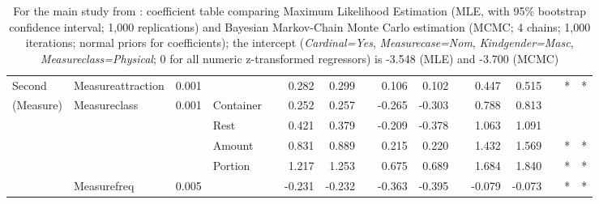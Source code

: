 \begin{table}
{\begin{tabular}{llrlp{0.5em}rrp{0.5em}rrp{0.5em}rrp{0.5em}cc}
       Second    & Measureattraction &  0.001 &           &&  0.282 &  0.299 &&  0.106 &  0.102 &&  0.447 &  0.515 && * & * \\
       (Measure) & Measureclass      &  0.001 & Container &&  0.252 &  0.257 && -0.265 & -0.303 &&  0.788 &  0.813 &&   &   \\
                 &                   &        & Rest      &&  0.421 &  0.379 && -0.209 & -0.378 &&  1.063 &  1.091 &&   &   \\
                 &                   &        & Amount    &&  0.831 &  0.889 &&  0.215 &  0.220 &&  1.432 &  1.569 && * & * \\
                 &                   &        & Portion   &&  1.217 &  1.253 &&  0.675 &  0.689 &&  1.684 &  1.840 && * & * \\
                 & Measurefreq       &  0.005 &           && -0.231 & -0.232 && -0.363 & -0.395 && -0.079 & -0.073 && * & * \\

  \end{tabular}
  }
  \caption{For the main study from \ROMeasure: coefficient table comparing Maximum Likelihood Estimation (MLE, with 95\% bootstrap confidence interval; 1,000 replications) and Bayesian Markov-Chain Monte Carlo estimation (MCMC; 4 chains; 1,000 iterations; normal priors for coefficients); the intercept (\textit{Cardinal=Yes}, \textit{Measurecase=Nom}, \textit{Kindgender=Masc}, \textit{Measureclass=Physical}; 0 for all numeric z-transformed regressors) is -3.548 (MLE) and -3.700 (MCMC)}
  \label{tab:bigtable}
\end{table}

